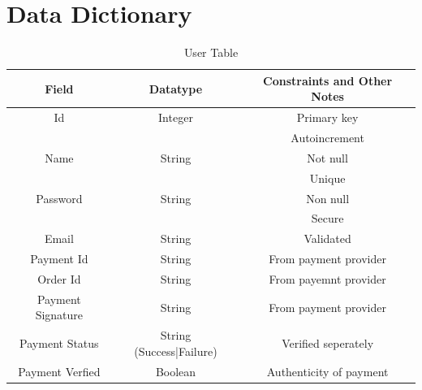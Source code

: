 \documentclass[12pt,a4paper]{report}
\begin{document}
\section{Data Dictionary}\label{sec:data_dictionary}
\begin{table}[h!]
	\centering
	\caption{User Table}
	\begin{tabular}{|c|c|c|}
		\hline
		\textbf{Field}    & \textbf{Datatype}        & \textbf{Constraints and Other Notes} \\
		\hline
		Id                & Integer                  & Primary key                          \\
		                  &                          & Autoincrement                        \\
		\hline
		Name              & String                   & Not null                             \\
		                  &                          & Unique                               \\
		\hline
		Password          & String                   & Non null                             \\
		                  &                          & Secure                               \\
		\hline
		Email             & String                   & Validated                            \\
		\hline
		Payment Id        & String                   & From payment provider                \\
		\hline
		Order Id          & String                   & From payemnt provider                \\
		\hline
		Payment Signature & String                   & From payment provider                \\
		\hline
		Payment Status    & String (Success|Failure) & Verified seperately                  \\
		\hline
		Payment Verfied   & Boolean                  & Authenticity of payment              \\
		\hline
	\end{tabular}
	\label{table:user}
\end{table}
\end{document}

